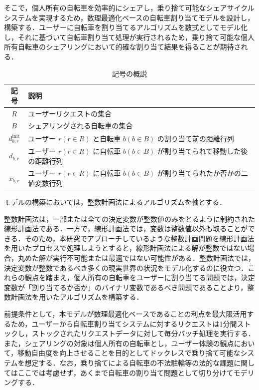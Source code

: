       \par そこで，個人所有の自転車を効率的にシェアし，乗り捨て可能なシェアサイクルシステムを実現するため，数理最適化ベースの自転車割り当てモデルを設計し，構築する．ユーザーに自転車を割り当てるアルゴリズムを数式としてモデル化し，それに基づいて自転車割り当て処理が実行されるため，乗り捨て可能な個人所有自転車のシェアリングにおいて的確な割り当て結果を得ることが期待される．
      
      \begin{table}[t]
        \caption{記号の概説}
        \label{tab:記号の概説}
        \centering
        \begin{tabular}{c p{6cm}}
          \hline 
          記号 & 説明 \\
          \hline
          $R$ & ユーザーリクエストの集合 \\
          $B$ & シェアリングされる自転車の集合 \\
          $d^{\text{init}}_{b,r}$ & ユーザー $r(r \in R)$ と自転車 $b(b \in B)$ の割り当て前の距離行列\\
          $d_{b,r}$ & ユーザー $r (r \in R)$ に自転車 $b (b \in B)$ が割り当てられて移動した後の距離行列 \\
          $x_{b,r}$ & ユーザー $r (r \in R)$ に自転車 $b (b \in B)$ が割り当てられたか否かの二値変数行列 \\
          \hline
        \end{tabular}
      \end{table}
          
      \par モデルの構築においては，整数計画法によるアルゴリズムを軸とする．
          
      \par 整数計画法は，一部または全ての決定変数が整数値のみをとるように制約された線形計画法である\cite{wolsey2020integer}．一方で，線形計画法では，変数は整数値以外も取ることができる．そのため，本研究でアプローチしているような整数計画問題を線形計画法を用いたプロセスで処理しようとすると，線形計画法による解が整数ではない場合，丸めた解が実行不可能または最適ではない可能性がある\cite{hooker2024integer}．整数計画法では，決定変数が整数であるべき多くの現実世界の状況をモデル化するのに役立つ\cite{gomory1960integer}．これらの観点を踏まえ，個人所有の自転車をユーザーに割り当てる問題では，決定変数が「割り当てるか否か」のバイナリ変数であるべき問題であることより，整数計画法を用いたアルゴリズムを構築する．
          
      \par 前提条件として，本モデルが数理最適化ベースであることの利点を最大限活用するため，ユーザーから自転車割り当てシステムに対するリクエストは1分間ストックし，ストックされたリクエストデータに対して毎分バッチ処理を実行する．また，シェアリングの対象は個人所有の自転車とし，ユーザー体験の観点において，移動自由度を向上させることを目的としてドックレスで乗り捨て可能なシステムを想定する．なお，乗り捨てによる自転車の不法駐輪等の法的な課題に関してはここでは考慮せず，あくまで自転車の割り当て問題として切り分けてモデリングする．
          
